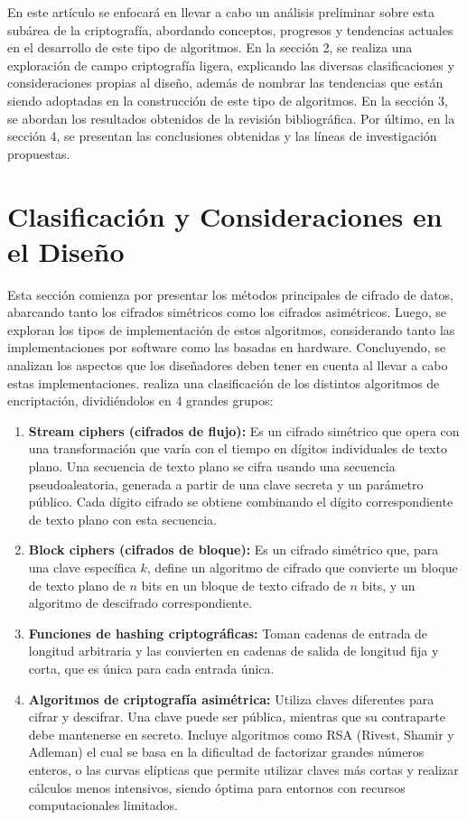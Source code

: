 \documentclass[a4paper,10pt]{article}
\begin{document}
	En este artículo se enfocará en llevar a cabo un análisis preliminar sobre esta subárea de la criptografía, abordando conceptos, progresos y tendencias actuales en el desarrollo de este tipo de algoritmos. En la sección 2, se realiza una exploración de campo criptografía ligera, explicando las diversas clasificaciones y consideraciones propias al diseño, además de nombrar las tendencias que están siendo adoptadas en la construcción de este tipo de algoritmos. En la sección 3, se abordan los resultados obtenidos de la revisión bibliográfica. Por último, en la sección 4, se presentan las conclusiones obtenidas y las líneas de investigación propuestas.
	
	\section{Clasificación y Consideraciones en el Diseño}
	\label{seccion2}
	Esta sección comienza por presentar los métodos principales de cifrado de datos, abarcando tanto los cifrados simétricos como los cifrados asimétricos. Luego, se exploran los tipos de implementación de estos algoritmos, considerando tanto las implementaciones por software como las basadas en hardware. Concluyendo, se analizan los aspectos que los diseñadores deben tener en cuenta al llevar a cabo estas implementaciones.
	\textcite{wehbe2022criptografia} realiza una clasificación de los distintos algoritmos de encriptación, dividiéndolos en 4 grandes grupos:
	\begin{enumerate}
		\item \textbf{Stream ciphers (cifrados de flujo): }Es un cifrado simétrico que opera con una transformación que varía con el tiempo en dígitos individuales de texto plano. Una secuencia de texto plano se cifra usando una secuencia pseudoaleatoria, generada a partir de una clave secreta y un parámetro público. Cada dígito cifrado se obtiene combinando el dígito correspondiente de texto plano con esta secuencia.
		\item \textbf{Block ciphers (cifrados de bloque):} Es un cifrado simétrico que, para una clave específica $k$, define un algoritmo de cifrado que convierte un bloque de texto plano de $n$ bits en un bloque de texto cifrado de $n$ bits, y un algoritmo de descifrado correspondiente.
		\item \textbf{Funciones de hashing criptográficas: }Toman cadenas de entrada de longitud arbitraria y las convierten en cadenas de salida de longitud fija y corta, que es única para cada entrada única.
		\item \textbf{Algoritmos de criptografía asimétrica:} Utiliza claves diferentes para cifrar y descifrar. Una clave puede ser pública, mientras que su contraparte debe mantenerse en secreto. Incluye algoritmos como RSA (Rivest, Shamir y Adleman) el cual se basa en la dificultad de factorizar grandes números enteros, o las curvas elípticas que permite utilizar claves más cortas y realizar cálculos menos intensivos, siendo óptima para entornos con recursos computacionales limitados.
	\end{enumerate}
\end{document}

